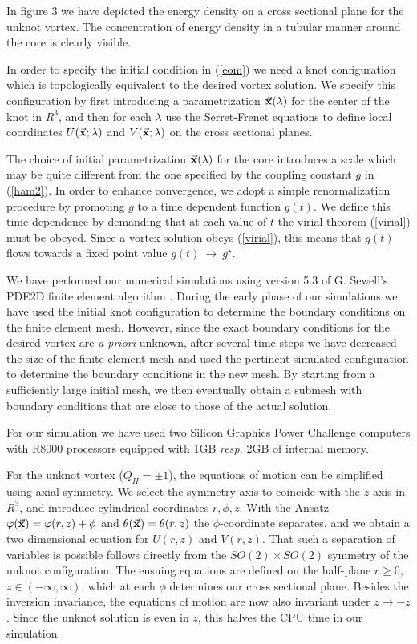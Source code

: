 In figure 3 we have depicted the energy density on a
cross sectional plane for the unknot vortex. The concentration
of energy density in a tubular manner 
around the core is clearly visible.

In order to specify the initial condition
in (\ref{eom}) we need 
a knot configuration which is topologically
equivalent
to the desired vortex solution. We specify this configuration
by first introducing a parametrization $\vec{\bf x}(\lambda)$ 
for the center of the knot in $R^3$, and then
for each $\lambda$ use the Serret-Frenet 
equations to define local
coordinates  $U(\vec{\bf x} ; \lambda)$ 
and $V(\vec{\bf x} ; \lambda)$
on the cross sectional planes.

The choice of initial parametrization
$\vec {\bf x}(\lambda)$ for the core
introduces a scale which may be quite
different from the one specified
by the coupling constant $g$ in (\ref{ham2}). 
In order to enhance convergence, we
adopt a simple renormalization procedure
by promoting $g$ to a time dependent
function $g(t)$. We define this 
time dependence
by demanding that at each value of $t$ the virial
theorem (\ref{virial}) must be obeyed. Since
a vortex solution 
obeys (\ref{virial}), this means that $g(t)$
flows towards a fixed point value $
g(t) \ \to \ g^{\star} $.

\vskip 0.3cm
We have performed our numerical simulations
using version 5.3 of G. Sewell's PDE2D finite element
algorithm  \cite{sewell}.
During the early phase of our simulations we
have used the
initial knot configuration
to determine the boundary conditions
on the finite element mesh.
However, since
the exact boundary conditions for the desired vortex
are {\it a priori} unknown, after several
time steps we have decreased the size of the
finite element mesh 
and used the pertinent
simulated configuration to determine the boundary conditions
in the new mesh. By starting from a sufficiently
large initial mesh, we then eventually obtain
a submesh with boundary conditions that are close
to those of the actual solution.

For our simulation we have used
two Silicon Graphics Power Challenge computers
with R8000 processors equipped with
1GB {\it resp.} 2GB of internal memory.

\vskip 0.3cm
For the unknot vortex ($Q_H = \pm 1$), 
the equations of motion
can be simplified using axial symmetry. 
We select the symmetry axis 
to coincide with the $z$-axis in $R^3$, and
introduce cylindrical coordinates $
r, \phi, z$. With the Ansatz $
\varphi (\vec{\bf x})  = 
\varphi(r, z) +   \phi $ and 
$\theta (\vec{\bf x } )  =  \theta (r , z ) $
the $\phi$-coordinate separates, and 
we obtain a two dimensional equation for $U(r, z)$ 
and $V(r,z)$. That 
such a separation of variables is possible
follows directly from the $SO(2) \times SO(2)$
symmetry of the unknot configuration.
The ensuing equations are
defined on the half-plane $r \geq 0$, $z \in 
( -\infty, \infty)$, which at each $\phi$
determines our cross sectional plane.
Besides the inversion invariance, the equations
of motion are now also invariant under $z \to -z$.
Since the unknot solution is even in $z$, this halves the
CPU time in our simulation.


